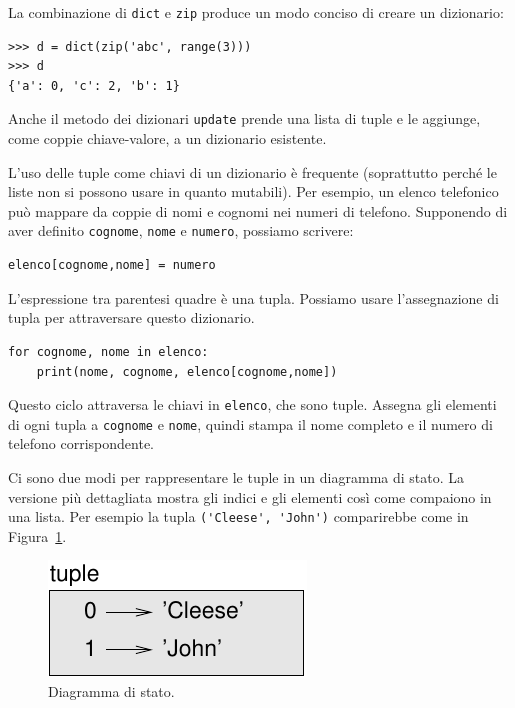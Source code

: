 \documentclass[10pt]{book}
\begin{document}
La combinazione di {\tt dict} e {\tt zip} produce un modo conciso di creare un dizionario:

\begin{verbatim}
>>> d = dict(zip('abc', range(3)))
>>> d
{'a': 0, 'c': 2, 'b': 1}
\end{verbatim}
%
Anche il metodo dei dizionari {\tt update} prende una lista di tuple e le aggiunge, come coppie chiave-valore, a un dizionario esistente.

L'uso delle tuple come chiavi di un dizionario è frequente (soprattutto perché le liste non si possono usare in quanto mutabili). Per esempio, un elenco telefonico può mappare da coppie di nomi e cognomi nei numeri di telefono. Supponendo di aver definito {\tt cognome}, {\tt nome} e {\tt numero}, possiamo scrivere:

\begin{verbatim}
elenco[cognome,nome] = numero
\end{verbatim}
%
L'espressione tra parentesi quadre è una tupla. Possiamo usare l'assegnazione di tupla per attraversare questo dizionario.

\begin{verbatim}
for cognome, nome in elenco:
    print(nome, cognome, elenco[cognome,nome])
\end{verbatim}
%
Questo ciclo attraversa le chiavi in {\tt elenco}, che sono tuple. Assegna gli elementi di ogni tupla a {\tt cognome} e {\tt nome}, quindi stampa il nome completo e il numero di telefono corrispondente.

Ci sono due modi per rappresentare le tuple in un diagramma di stato. La versione più dettagliata mostra gli indici e gli elementi così come compaiono in una lista. Per esempio la tupla \verb"('Cleese', 'John')" comparirebbe come in Figura~\ref{fig.tuple1}.

\begin{figure}
\centerline
{\includegraphics[scale=0.8]{figs/tuple1.pdf}}
\caption{Diagramma di stato.}
\label{fig.tuple1}
\end{figure}
\end{document}
